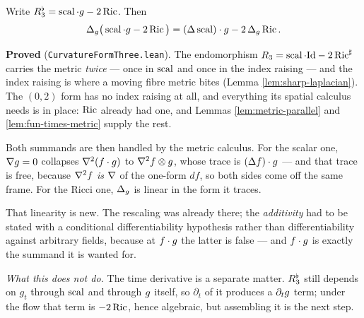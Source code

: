 \begin{lemma}
  \label{lem:curvature-form-three}
  \leanok
  Write $R_3^\flat = \operatorname{scal}\cdot g - 2\operatorname{Ric}$. Then
  \[
    \Delta_g\big(\operatorname{scal}\cdot g - 2\operatorname{Ric}\big)
      = (\Delta \operatorname{scal})\cdot g - 2\,\Delta_g \operatorname{Ric} .
  \]

  \textbf{Proved} (\texttt{CurvatureFormThree.lean}). The endomorphism
  $R_3 = \operatorname{scal}\cdot\mathrm{Id} - 2\operatorname{Ric}^\sharp$ carries the metric
  \emph{twice} --- once in $\operatorname{scal}$ and once in the index raising --- and the
  index raising is where a moving fibre metric bites
  (Lemma \ref{lem:sharp-laplacian}). The $(0,2)$ form has no index raising at
  all, and everything its spatial calculus needs is in place: $\operatorname{Ric}$ already had
  one, and Lemmas \ref{lem:metric-parallel} and \ref{lem:fun-times-metric}
  supply the rest.

  Both summands are then handled by the metric calculus. For the scalar one,
  $\nabla g = 0$ collapses $\nabla^2(f\cdot g)$ to $\nabla^2 f\otimes g$, whose trace
  is $(\Delta f)\cdot g$ --- and that trace is free, because $\nabla^2 f$
  \emph{is} $\nabla$ of the one-form $df$, so both sides come off the same frame.
  For the Ricci one, $\Delta_g$ is linear in the form it traces.

  That linearity is new. The rescaling was already there; the \emph{additivity}
  had to be stated with a conditional differentiability hypothesis rather than
  differentiability against arbitrary fields, because at $f\cdot g$ the latter
  is false --- and $f\cdot g$ is exactly the summand it is wanted for.

  \emph{What this does not do.} The time derivative is a separate matter.
  $R_3^\flat$ still depends on $g_t$ through $\operatorname{scal}$ and through $g$
  itself, so $\partial_t$ of it produces a $\partial_t g$ term; under the flow
  that term is $-2\operatorname{Ric}$, hence algebraic, but assembling it is the next step.
\end{lemma}

